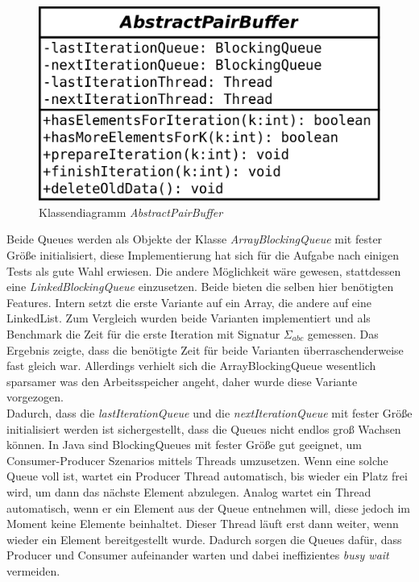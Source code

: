 \documentclass[12pt,a4paper]{article}
\begin{document}
\begin{figure}
\includegraphics[width=0.45\linewidth]{bilder/AbstractPairBuffer.png}
\caption{Klassendiagramm \textit{AbstractPairBuffer}}
\label{pic:abstractpairbuffer}
\end{figure}



Beide Queues werden als Objekte der Klasse \textit{ArrayBlockingQueue} mit fester Größe initialisiert, diese Implementierung hat sich für die Aufgabe nach einigen Tests als gute Wahl erwiesen. Die andere Möglichkeit wäre gewesen, stattdessen eine \textit{LinkedBlockingQueue} einzusetzen. Beide bieten die selben hier benötigten Features. Intern setzt die erste Variante auf ein Array, die andere auf eine LinkedList. Zum Vergleich wurden beide Varianten implementiert und als Benchmark die Zeit für die erste Iteration mit Signatur $\Sigma_{abc}$ gemessen. Das Ergebnis zeigte, dass die benötigte Zeit für beide Varianten überraschenderweise fast gleich war.  Allerdings verhielt sich die ArrayBlockingQueue wesentlich sparsamer was den Arbeitsspeicher angeht, daher wurde diese Variante vorgezogen. \\
Dadurch, dass die \textit{lastIterationQueue} und die \textit{nextIterationQueue} mit fester Größe initialisiert werden ist sichergestellt, dass die Queues nicht endlos groß Wachsen können. In Java sind BlockingQueues mit fester Größe gut geeignet, um Consumer-Producer Szenarios  mittels Threads umzusetzen. Wenn eine solche Queue voll ist, wartet ein Producer Thread automatisch, bis wieder ein Platz frei wird, um dann das nächste Element abzulegen. Analog wartet ein Thread automatisch, wenn er ein Element aus der Queue entnehmen will, diese jedoch im Moment keine Elemente beinhaltet. Dieser Thread läuft erst dann weiter, wenn wieder ein Element bereitgestellt wurde. Dadurch sorgen die Queues dafür, dass Producer und Consumer aufeinander warten und dabei ineffizientes \textit{busy wait} vermeiden.\\
\end{document}

